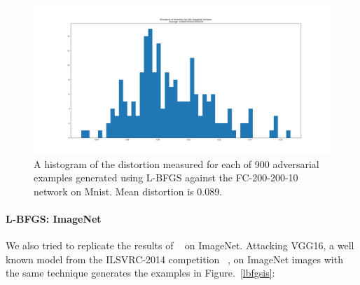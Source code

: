 \begin{figure}[ht]
\includegraphics[trim=200 80 100 100, clip, width=16cm]{c1_figures/FC200-200-10-distortion_hist.png}
\caption{A histogram of the distortion measured for each of 900 adversarial examples generated using L-BFGS against the FC-200-200-10 network on Mnist. Mean distortion is 0.089.}
\label{lbfgsh}
\end{figure}

\paragraph{L-BFGS: ImageNet}
\label{lbfgs-s}
We also tried to replicate the results of ~\citet{szegedy2013} on ImageNet. Attacking VGG16, a well known model from the ILSVRC-2014 competition ~\citep{simonyan2014very}, on ImageNet images with the same technique generates the examples in Figure.~\ref{lbfgsis}: 

